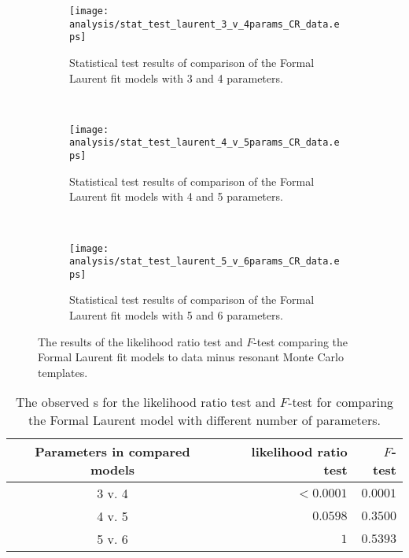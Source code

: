 \begin{figure}[htbp]
 \centering
 \begin{subfigure}[t]{0.333\textwidth}
  \centering
  \texttt{[image: analysis/stat\_test\_laurent\_3\_v\_4params\_CR\_data.eps]}
  \caption[Comparison of the Formal Laurent fit models with 3 and 4 parameters.]{%
   Statistical test results of comparison of the Formal Laurent fit models with 3 and 4 parameters.}
  \label{fig:stat_test_laurent_3_v_4params_CR_data}
 \end{subfigure}%
 ~
 \begin{subfigure}[t]{0.333\textwidth}
  \centering
  \texttt{[image: analysis/stat\_test\_laurent\_4\_v\_5params\_CR\_data.eps]}
  \caption[Comparison of the Formal Laurent fit models with 4 and 5 parameters.]{%
   Statistical test results of comparison of the Formal Laurent fit models with 4 and 5 parameters.}
  \label{fig:stat_test_laurent_4_v_5params_CR_data}
 \end{subfigure}%
 ~
 \begin{subfigure}[t]{0.333\textwidth}
  \centering
  \texttt{[image: analysis/stat\_test\_laurent\_5\_v\_6params\_CR\_data.eps]}
  \caption[Comparison of the Formal Laurent fit models with 5 and 6 parameters.]{%
   Statistical test results of comparison of the Formal Laurent fit models with 5 and 6 parameters.}
  \label{fig:stat_test_laurent_5_v_6params_CR_data}
 \end{subfigure}%
 \caption[The results of the likelihood ratio test and $F$-test comparing the Formal Laurent fit models to \CRQCD{} data minus resonant Monte Carlo templates.]{%
  The results of the likelihood ratio test and $F$-test comparing the Formal Laurent fit models to \CRQCD{} data minus resonant Monte Carlo templates.}
 \label{fig:likelihood_ratio_test_laurent}
\end{figure}

\begin{table}[htbp]
 \centering
 \caption{The observed \pvalue{}s for the likelihood ratio test and $F$-test for comparing the Formal Laurent model with different number of parameters.}
 \label{table:stat_test_parameters_laurent}
 \begin{tabular}{@{}crr@{}} \toprule
  Parameters in compared models & likelihood ratio test \pvalue{} & $F$-test \pvalue{} \\ \midrule
  3 v. 4                        & $<0.0001$                       & $0.0001$           \\
  4 v. 5                        & $0.0598$                        & $0.3500$           \\
  5 v. 6                        & $1$                             & $0.5393$           \\
  \bottomrule
 \end{tabular}
\end{table}

